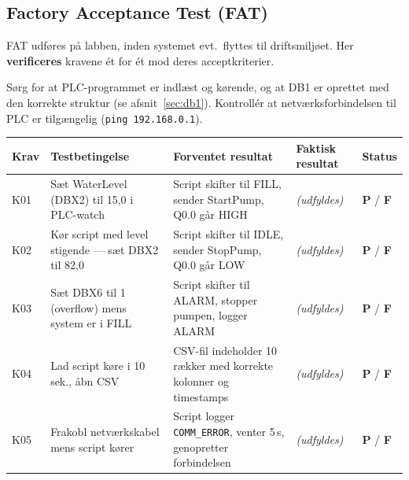 \documentclass[12pt, a4paper]{article}
\begin{document}
\subsection{Factory Acceptance Test (FAT)}\label{sec:fat}

FAT udføres på labben, inden systemet evt.\ flyttes til driftsmiljøet.
Her \textbf{verificeres} kravene ét for ét mod deres acceptkriterier.

\begin{tcolorbox}[warnbox, title={\faExclamationTriangle\quad Inden testen}]
Sørg for at PLC-programmet er indlæst og kørende, og at DB1 er oprettet med
den korrekte struktur (se afsnit~\ref{sec:db1}).
Kontrollér at netværksforbindelsen til PLC er tilgængelig (\texttt{ping 192.168.0.1}).
\end{tcolorbox}

\vspace{0.4cm}

\begin{tabularx}{\textwidth}{p{1cm} p{2.6cm} p{3.8cm} p{3.8cm} p{1.5cm}}
\toprule
\textbf{Krav} & \textbf{Testbetingelse} & \textbf{Forventet resultat} & \textbf{Faktisk resultat} & \textbf{Status} \\
\midrule
K01 &
  Sæt WaterLevel (DBX2) til 15{,}0 i PLC-watch &
  Script skifter til FILL, sender StartPump, Q0.0 går HIGH &
  \textit{(udfyldes)} &
  \textcolor{passgreen}{\textbf{P}} \;/\; \textcolor{failred}{\textbf{F}} \\[6pt]

K02 &
  Kør script med level stigende --- sæt DBX2 til 82{,}0 &
  Script skifter til IDLE, sender StopPump, Q0.0 går LOW &
  \textit{(udfyldes)} &
  \textcolor{passgreen}{\textbf{P}} \;/\; \textcolor{failred}{\textbf{F}} \\[6pt]

K03 &
  Sæt DBX6 til 1 (overflow) mens system er i FILL &
  Script skifter til ALARM, stopper pumpen, logger ALARM &
  \textit{(udfyldes)} &
  \textcolor{passgreen}{\textbf{P}} \;/\; \textcolor{failred}{\textbf{F}} \\[6pt]

K04 &
  Lad script køre i 10 sek., åbn CSV &
  CSV-fil indeholder 10 rækker med korrekte kolonner og timestamps &
  \textit{(udfyldes)} &
  \textcolor{passgreen}{\textbf{P}} \;/\; \textcolor{failred}{\textbf{F}} \\[6pt]

K05 &
  Frakobl netværkskabel mens script kører &
  Script logger \texttt{COMM\_ERROR}, venter 5\,s, genopretter forbindelsen &
  \textit{(udfyldes)} &
  \textcolor{passgreen}{\textbf{P}} \;/\; \textcolor{failred}{\textbf{F}} \\
\bottomrule
\end{tabularx}
\end{document}
